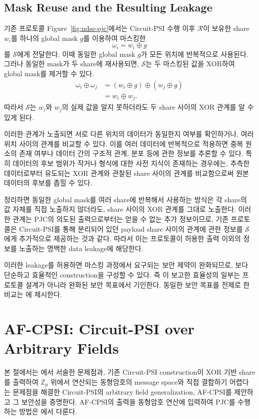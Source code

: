 \documentclass[sigconf,anonymous,review]{acmart}
\begin{document}
\subsection{Mask Reuse and the Resulting Leakage}\label{sec:LTScryptanalysis}
기존 프로토콜 Figure~\ref{fig:ndss-pjc}에서는 Circuit-PSI 수행 이후
$\mathcal{R}$이 보유한 share $w_i$를 하나의 global mask $g$를 이용하여
마스킹한
\[
    \omega_i = w_i \oplus g
\]
를 $\mathcal{S}$에게 전달한다. 이때 동일한 global mask $g$가 모든 위치에
반복적으로 사용된다. 그러나 동일한 mask가 두 share에 재사용되면, $\mathcal{S}$는 두 마스킹된 값을
XOR하여 global mask를 제거할 수 있다.
\[
\begin{aligned}
    \omega_i \oplus \omega_j
    &= (w_i \oplus g) \oplus (w_j \oplus g)\\
    &= w_i \oplus w_j.
\end{aligned}
\]
따라서 $\mathcal{S}$는 $w_i$와 $w_j$의 실제 값을 알지 못하더라도
두 share 사이의 XOR 관계를 알 수 있게 된다.

이러한 관계가 노출되면 서로 다른 위치의 데이터가 동일한지 여부를
확인하거나, 여러 위치 사이의 관계를 비교할 수 있다. 이를 여러 데이터에
반복적으로 적용하면 중복 원소의 존재 여부나 데이터 간의 구조적 관계, 분포 등에 관한 정보를 추론할 수 있다. 특히 데이터의 후보 범위가 작거나 형식에 대한 사전 지식이 존재하는 경우에는, 추측한 데이터로부터 유도되는 XOR 관계와 관찰된 share 사이의 관계를 비교함으로써 원본 데이터의 후보를 좁힐 수 있다.

정리하면 동일한 global mask를 여러 share에 반복해서 사용하는 방식은 각 share의
값 자체를 직접 노출하지 않더라도, share 사이의 XOR 관계를 그대로 노출한다. 이러한 관계는 PJC의 의도된 출력으로부터는 얻을 수 없는 추가 정보이므로, 기존 프로토콜은 Circuit-PSI를 통해 분리되어 있던 payload share 사이의 관계에 관한 정보를 $\mathcal{S}$에게 추가적으로 제공하는 것과 같다. 따라서 이는 프로토콜이 허용한 출력 이외의 정보를 노출하는 명백한 data leakage에 해당한다.

이러한 leakage를 허용하면 마스킹 과정에서 요구되는 보안 제약이 완화되므로, 보다 단순하고 효율적인 construction을 구성할 수 있다. 즉 \cite{LTS+26}이 보고한 효율성의 일부는 프로토콜 설계가 아니라 완화된 보안 목표에서 기인한다. 동일한 보안 목표를 전제로 한 비교는 에 제시한다.


\section{AF-CPSI: Circuit-PSI over Arbitrary Fields}\label{sec:our-protocol}\label{sec:cpsi-zp}
본 절에서는 에서 서술한 문제점과, 기존 Circuit-PSI
construction이 XOR 기반 share를 출력하여 $\mathbb{Z}_p$ 위에서 연산되는 동형암호의
message space와 직접 결합하기 어렵다는 문제점을 해결한 Circuit-PSI의 arbitrary
field generalization, AF-CPSI를 제안하고 그 보안성을 증명한다. AF-CPSI의 출력을
동형암호 연산에 입력하여 PJC를 수행하는 방법은 에서 다룬다.
\end{document}

